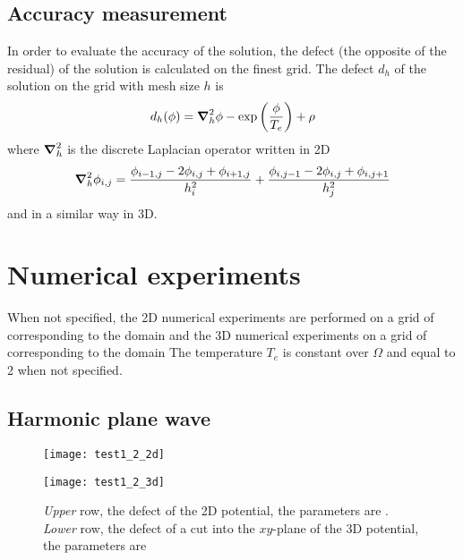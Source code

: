 \documentclass[10pt,a4paper]{article}
\begin{document}
\subsection{Accuracy measurement}

In order to evaluate the accuracy of the solution, the defect (the opposite of 
the residual) of the solution is calculated on the finest grid. 
The defect $d_h$ of the solution on the grid with mesh size $h$ is
\begin{align}
d_h(\phi)=\grad_h^2\phi-\exp\left(\frac{\phi}{T_e}\right)+\rho
\end{align}
where $\grad_h^2$ is the  discrete Laplacian operator written in 2D
\begin{align}
\grad_h^2\phi_{i,j}=
\frac{\phi_{i-1,j}-2\phi_{i,j}+\phi_{i+1,j}}{h_i^2}+
\frac{\phi_{i,j-1}-2\phi_{i,j}+\phi_{i,j+1}}{h_j^2}
\end{align}
and in a similar way in 3D.

\section{Numerical experiments}

When not specified, the 2D numerical experiments are performed on a grid of
 corresponding to the domain  and the 3D
numerical experiments on a grid of  corresponding to the
domain 
The temperature $T_e$ is constant over $\Omega$ and equal to 2 when not
specified.

\subsection{Harmonic plane wave}

\begin{figure}
\centerline{\texttt{[image: test1\_2\_2d]}}
\centerline{\texttt{[image: test1\_2\_3d]}}
\caption{\emph{Upper} row, the defect of the 2D
potential, the parameters are \protect. \emph{Lower}
row, the defect of a cut into the $xy$-plane
of the 3D potential, the parameters are \protect }
\label{fig:1_2_23d}
\end{figure}
\end{document}
